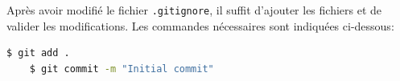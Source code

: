 \documentclass[]{report}
\begin{document}
    Après avoir modifié le fichier \verb|.gitignore|, il suffit d'ajouter les fichiers et de valider les modifications. Les commandes nécessaires sont indiquées ci-dessous:

    \begin{scriptsize}
    \begin{lstlisting}[language=bash, breaklines]
    $ git add .
    $ git commit -m "Initial commit"
    \end{lstlisting}
    \end{scriptsize}
\end{document}
